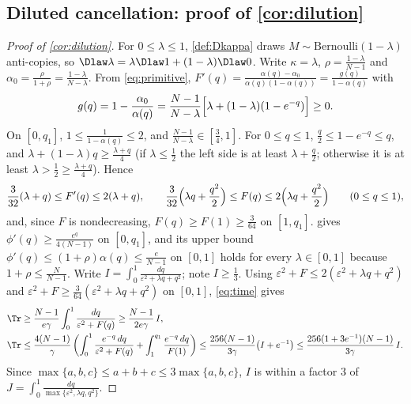 \subsection{Diluted cancellation: proof of \texorpdfstring{\cref{cor:dilution}}{the dilution corollary}}
\label{app:dilution}
\begin{proof}[Proof of \cref{cor:dilution}]
For $0\le\lambda\le1$, \cref{def:Dkappa} draws $M\sim\mathrm{Bernoulli}(1-\lambda)$ anti-copies, so $\Dlaw\lambda=\lambda\Dlaw1+(1-\lambda)\Dlaw0$.
Write $\kappa=\lambda$, $\rho=\tfrac{1-\lambda}{N-1}$ and $\alpha_0=\tfrac{\rho}{1+\rho}=\tfrac{1-\lambda}{N-\lambda}$.
From \cref{eq:primitive}, $F'(q)=\tfrac{\alpha(q)-\alpha_0}{\alpha(q)(1-\alpha(q))}=\tfrac{g(q)}{1-\alpha(q)}$ with
\[
 g(q)=1-\frac{\alpha_0}{\alpha(q)}=\frac{N-1}{N-\lambda}\Bigl[\lambda+(1-\lambda)(1-e^{-q})\Bigr]\ge0 .
\]
On $[0,q_1]$, $1\le\tfrac{1}{1-\alpha(q)}\le2$, and $\tfrac{N-1}{N-\lambda}\in[\tfrac{3}{4},1]$. For $0\le q\le1$, $\tfrac{q}{2}\le1-e^{-q}\le q$, and
$\lambda+(1-\lambda)q\ge\tfrac{\lambda+q}{4}$ (if $\lambda\le\tfrac12$ the left side is at least $\lambda+\tfrac{q}{2}$; otherwise it is at least $\lambda>\tfrac12\ge\tfrac{\lambda+q}{4}$). Hence
\[
 \frac{3}{32}(\lambda+q)\le F'(q)\le2(\lambda+q),\qquad
 \frac{3}{32}\Bigl(\lambda q+\frac{q^2}{2}\Bigr)\le F(q)\le2\Bigl(\lambda q+\frac{q^2}{2}\Bigr)\qquad(0\le q\le1),
\]
and, since $F$ is nondecreasing, $F(q)\ge F(1)\ge\tfrac{3}{64}$ on $[1,q_1]$.
 gives $\phi'(q)\ge\tfrac{e^q}{4(N-1)}$ on $[0,q_1]$, and its upper bound $\phi'(q)\le(1+\rho)\alpha(q)\le\tfrac{e}{N-1}$ on $[0,1]$ holds for every $\lambda\in[0,1]$ because $1+\rho\le\tfrac{N}{N-1}$.
Write $I=\int_0^1\tfrac{dq}{\varepsilon^2+\lambda q+q^2}$; note $I\ge\tfrac{1}{3}$. Using $\varepsilon^2+F\le2(\varepsilon^2+\lambda q+q^2)$ and $\varepsilon^2+F\ge\tfrac{3}{64}(\varepsilon^2+\lambda q+q^2)$ on $[0,1]$, \cref{eq:time} gives
\begin{align*}
 \Tr&\ge\frac{N-1}{e\gamma}\int_0^1\frac{dq}{\varepsilon^2+F(q)}\ge\frac{N-1}{2e\gamma}\,I,\\
 \Tr&\le\frac{4(N-1)}{\gamma}\left(\int_0^1\frac{e^{-q}\,dq}{\varepsilon^2+F(q)}+\int_1^{q_1}\frac{e^{-q}\,dq}{F(1)}\right)
 \le\frac{256(N-1)}{3\gamma}\bigl(I+e^{-1}\bigr)\le\frac{256(1+3e^{-1})(N-1)}{3\gamma}\,I .
\end{align*}
Since $\max\{a,b,c\}\le a+b+c\le3\max\{a,b,c\}$, $I$ is within a factor $3$ of $J=\int_0^1\tfrac{dq}{\max\{\varepsilon^2,\lambda q,q^2\}}$.

\end{proof}
